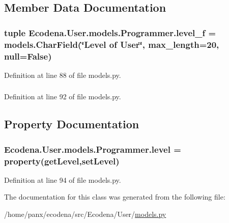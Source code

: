 \subsection{Member Data Documentation}
\hypertarget{class_ecodena_1_1_user_1_1models_1_1_programmer_acac46c16e9e503624e807cefa8650a96}{
\subsubsection[{level\_\-f}]{\setlength{\rightskip}{0pt plus 5cm}tuple {\bf Ecodena.User.models.Programmer.level\_\-f} = models.CharField(\char`\"{}Level of User\char`\"{}, max\_\-length=20, null=False)}}
\label{d2/d55/class_ecodena_1_1_user_1_1models_1_1_programmer_acac46c16e9e503624e807cefa8650a96}


Definition at line 88 of file models.py.

\hypertarget{class_ecodena_1_1_user_1_1models_1_1_programmer_a9bcbccb27a1d7d20c8f294630ec7c3f3}{
\subsubsection[{level\_\-f}]{}}
\label{d2/d55/class_ecodena_1_1_user_1_1models_1_1_programmer_a9bcbccb27a1d7d20c8f294630ec7c3f3}


Definition at line 92 of file models.py.



\subsection{Property Documentation}
\hypertarget{class_ecodena_1_1_user_1_1models_1_1_programmer_a80f2ba5c6d6e335e9f52a22624e933bf}{
\subsubsection[{level}]{\setlength{\rightskip}{0pt plus 5cm}Ecodena.User.models.Programmer.level = property(getLevel,setLevel)}}
\label{d2/d55/class_ecodena_1_1_user_1_1models_1_1_programmer_a80f2ba5c6d6e335e9f52a22624e933bf}


Definition at line 94 of file models.py.



The documentation for this class was generated from the following file:\begin{DoxyCompactItemize}
\item 
/home/panx/ecodena/src/Ecodena/User/\hyperlink{_user_2models_8py}{models.py}\end{DoxyCompactItemize}
